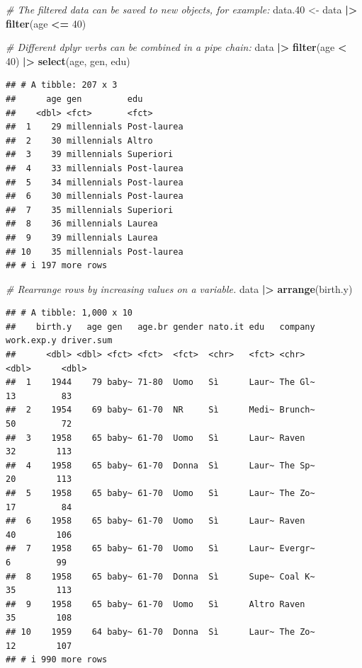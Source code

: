 \documentclass[
]{book}
\newenvironment{Shaded}{\begin{snugshade}}{\end{snugshade}}
\newcommand{\CommentTok}[1]{\textcolor[rgb]{0.56,0.35,0.01}{\textit{#1}}}
\newcommand{\DecValTok}[1]{\textcolor[rgb]{0.00,0.00,0.81}{#1}}
\newcommand{\FloatTok}[1]{\textcolor[rgb]{0.00,0.00,0.81}{#1}}
\newcommand{\FunctionTok}[1]{\textcolor[rgb]{0.13,0.29,0.53}{\textbf{#1}}}
\newcommand{\NormalTok}[1]{#1}
\newcommand{\OtherTok}[1]{\textcolor[rgb]{0.56,0.35,0.01}{#1}}
\newcommand{\SpecialCharTok}[1]{\textcolor[rgb]{0.81,0.36,0.00}{\textbf{#1}}}
\begin{document}
\begin{Shaded}
\begin{Highlighting}[]
\CommentTok{\# The filtered data can be saved to new objects, for example:}
\NormalTok{data}\FloatTok{.40} \OtherTok{\textless{}{-}}\NormalTok{ data }\SpecialCharTok{|\textgreater{}} 
  \FunctionTok{filter}\NormalTok{(age }\SpecialCharTok{\textless{}=} \DecValTok{40}\NormalTok{)}

\CommentTok{\# Different dplyr verbs can be combined in a pipe chain:}
\NormalTok{data }\SpecialCharTok{|\textgreater{}} 
  \FunctionTok{filter}\NormalTok{(age }\SpecialCharTok{\textless{}} \DecValTok{40}\NormalTok{) }\SpecialCharTok{|\textgreater{}} 
  \FunctionTok{select}\NormalTok{(age, gen, edu)}
\end{Highlighting}
\end{Shaded}

\begin{verbatim}
## # A tibble: 207 x 3
##      age gen         edu        
##    <dbl> <fct>       <fct>      
##  1    29 millennials Post-laurea
##  2    30 millennials Altro      
##  3    39 millennials Superiori  
##  4    33 millennials Post-laurea
##  5    34 millennials Post-laurea
##  6    30 millennials Post-laurea
##  7    35 millennials Superiori  
##  8    36 millennials Laurea     
##  9    39 millennials Laurea     
## 10    35 millennials Post-laurea
## # i 197 more rows
\end{verbatim}

\begin{Shaded}
\begin{Highlighting}[]
\CommentTok{\# Rearrange rows by increasing values on a variable.}
\NormalTok{data }\SpecialCharTok{|\textgreater{}} 
  \FunctionTok{arrange}\NormalTok{(birth.y)}
\end{Highlighting}
\end{Shaded}

\begin{verbatim}
## # A tibble: 1,000 x 10
##    birth.y   age gen   age.br gender nato.it edu   company work.exp.y driver.sum
##      <dbl> <dbl> <fct> <fct>  <fct>  <chr>   <fct> <chr>        <dbl>      <dbl>
##  1    1944    79 baby~ 71-80  Uomo   Sì      Laur~ The Gl~         13         83
##  2    1954    69 baby~ 61-70  NR     Sì      Medi~ Brunch~         50         72
##  3    1958    65 baby~ 61-70  Uomo   Sì      Laur~ Raven           32        113
##  4    1958    65 baby~ 61-70  Donna  Sì      Laur~ The Sp~         20        113
##  5    1958    65 baby~ 61-70  Uomo   Sì      Laur~ The Zo~         17         84
##  6    1958    65 baby~ 61-70  Uomo   Sì      Laur~ Raven           40        106
##  7    1958    65 baby~ 61-70  Uomo   Sì      Laur~ Evergr~          6         99
##  8    1958    65 baby~ 61-70  Donna  Sì      Supe~ Coal K~         35        113
##  9    1958    65 baby~ 61-70  Uomo   Sì      Altro Raven           35        108
## 10    1959    64 baby~ 61-70  Donna  Sì      Laur~ The Zo~         12        107
## # i 990 more rows
\end{verbatim}
\end{document}
